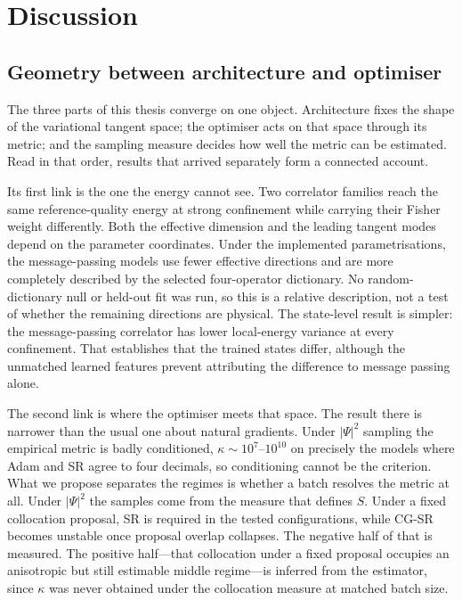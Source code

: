 
\begingroup
\let\clearpage\relax
\let\cleardoublepage\relax
\chapter{Discussion}
\label{ch:discussion}
\endgroup

\section{Geometry between architecture and optimiser}
\label{sec:repr-discussion}

The three parts of this thesis converge on one object. Architecture fixes the shape of the
variational tangent space; the optimiser acts on that space through its metric; and the
sampling measure decides how well the metric can be estimated. Read in that order, results
that arrived separately form a connected account.

Its first link is the one the energy cannot see. Two correlator families reach the same
reference-quality energy at strong confinement while carrying their Fisher weight
differently. Both the effective dimension and the leading tangent modes depend on the
parameter coordinates. Under the implemented parametrisations, the message-passing models
use fewer effective directions and are more completely described by the selected
four-operator dictionary. No random-dictionary null or held-out fit was run, so this is a
relative description, not a test of whether the remaining directions are physical. The
state-level result is simpler: the message-passing correlator has lower local-energy variance
at every confinement. That establishes that the trained states differ, although the
unmatched learned features prevent attributing the difference to message passing alone.

The second link is where the optimiser meets that space. The result there is narrower than
the usual one about natural gradients. Under $|\Psi|^2$ sampling the empirical metric is badly conditioned, $\kappa\sim10^{7}$--$10^{10}$ on precisely the models where Adam and SR agree to four decimals, so conditioning cannot be the criterion. What we propose separates the regimes
is whether a batch resolves the metric at all. Under $|\Psi|^2$ the samples come from the
measure that defines $S$. Under a fixed collocation proposal, SR is required in the tested
configurations, while CG-SR becomes unstable once proposal overlap collapses. The negative half of that is
measured. The positive half---that collocation under a fixed proposal occupies an
anisotropic but still estimable middle regime---is inferred from the estimator, since
$\kappa$ was never obtained under the collocation measure at matched batch size.

